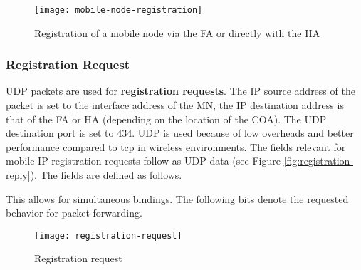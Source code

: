 
\begin{figure}[hb!]
	\centering
	\texttt{[image: mobile-node-registration]}
	\caption{Registration of a mobile node via the FA or directly with the HA}\label{fig:mobile_node_registration}
\end{figure}



\subsubsection*{Registration Request}
UDP packets are used for \textbf{registration requests}. The IP source address of the packet is set to the interface address of the MN, the IP destination address is that of the FA or HA (depending on the location of the COA). The UDP destination port is set to 434. UDP is used because of low overheads and better performance
compared to \gls{tcp} in wireless environments. The fields relevant for mobile IP registration requests follow as UDP data (see Figure \ref{fig:registration-reply}). The fields are defined as follows.


This allows for simultaneous bindings. The following bits denote the requested behavior for packet forwarding.


\begin{figure}[pht]
	\centering
	\texttt{[image: registration-request]}
	\caption{Registration request}\label{fig:registration-request}
\end{figure}

